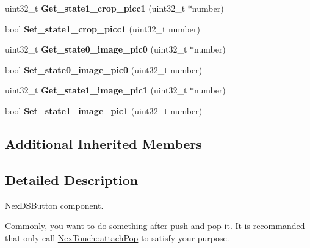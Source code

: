 \begin{DoxyCompactItemize}
\item 
\hypertarget{class_nex_d_s_button_a9b24e1ec4677bc8ec921ede2e36c4db6}{uint32\+\_\+t {\bfseries Get\+\_\+state1\+\_\+crop\+\_\+picc1} (uint32\+\_\+t $\ast$number)}\label{class_nex_d_s_button_a9b24e1ec4677bc8ec921ede2e36c4db6}

\item 
\hypertarget{class_nex_d_s_button_a1cc8c53007bf420a5e02e0c885ab7460}{bool {\bfseries Set\+\_\+state1\+\_\+crop\+\_\+picc1} (uint32\+\_\+t number)}\label{class_nex_d_s_button_a1cc8c53007bf420a5e02e0c885ab7460}

\item 
\hypertarget{class_nex_d_s_button_a8382bc9350b8e589d1ae5da684a0e907}{uint32\+\_\+t {\bfseries Get\+\_\+state0\+\_\+image\+\_\+pic0} (uint32\+\_\+t $\ast$number)}\label{class_nex_d_s_button_a8382bc9350b8e589d1ae5da684a0e907}

\item 
\hypertarget{class_nex_d_s_button_a24029fce19d9a0f75a6044e7a44bd925}{bool {\bfseries Set\+\_\+state0\+\_\+image\+\_\+pic0} (uint32\+\_\+t number)}\label{class_nex_d_s_button_a24029fce19d9a0f75a6044e7a44bd925}

\item 
\hypertarget{class_nex_d_s_button_ab52951034a07ac78a9bde09c0bae4514}{uint32\+\_\+t {\bfseries Get\+\_\+state1\+\_\+image\+\_\+pic1} (uint32\+\_\+t $\ast$number)}\label{class_nex_d_s_button_ab52951034a07ac78a9bde09c0bae4514}

\item 
\hypertarget{class_nex_d_s_button_a8d8aafa1a4970faed893db0b666e38b0}{bool {\bfseries Set\+\_\+state1\+\_\+image\+\_\+pic1} (uint32\+\_\+t number)}\label{class_nex_d_s_button_a8d8aafa1a4970faed893db0b666e38b0}

\end{DoxyCompactItemize}
\subsection*{Additional Inherited Members}


\subsection{Detailed Description}
\hyperlink{class_nex_d_s_button}{Nex\+D\+S\+Button} component.

Commonly, you want to do something after push and pop it. It is recommanded that only call \hyperlink{class_nex_touch_a4da1c4fcdfadb7eabfb9ccaba9ecad11}{Nex\+Touch\+::attach\+Pop} to satisfy your purpose.

